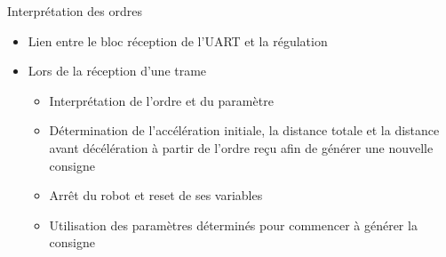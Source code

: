 \frame{\tableofcontents[currentsection]}

\begin{frame}{Interprétation des ordres}
  \begin{itemize}
    \item Lien entre le bloc réception de l'UART et la régulation
    \item Lors de la réception d'une trame
    \begin{itemize}
      \item Interprétation de l'ordre et du paramètre
      \item Détermination de l'accélération initiale, la distance totale et la distance avant décélération à partir de l'ordre reçu afin de générer une nouvelle consigne
      \item Arrêt du robot et reset de ses variables
      \item Utilisation des paramètres déterminés pour commencer à générer la consigne
    \end{itemize}
  \end{itemize}
\end{frame}
